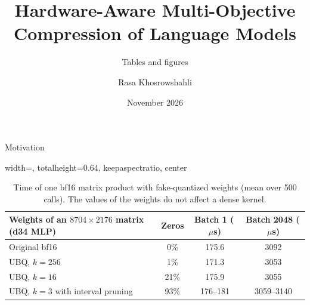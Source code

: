 \documentclass[aspectratio=169,10pt]{beamer}
\title{Hardware-Aware Multi-Objective Compression of Language Models}
\subtitle{Tables and figures}
\author{Rasa Khosrowshahli}
\date{November 2026}
\newcommand{\us}{\,$\mu$s}
\begin{document}
\begin{frame}
\titlepage
\end{frame}

\begin{frame}{Motivation}{}
\begin{table}
\centering
\begin{adjustbox}{width=\linewidth, totalheight=0.64\textheight, keepaspectratio, center}
\centering
\small
\begin{tabular}{lccc}
\toprule
Weights of an $8704\times2176$ matrix (d34 MLP) & Zeros & Batch 1 (\us) & Batch 2048 (\us) \\
\midrule
Original bf16                              & 0\%  & 175.6   & 3092 \\
UBQ, $k=256$                               & 1\%  & 171.3   & 3053 \\
UBQ, $k=16$                                & 21\% & 175.9   & 3055 \\
UBQ, $k=3$ with interval pruning           & 93\% & 176--181 & 3059--3140 \\
\bottomrule
\end{tabular}
\end{adjustbox}
\caption{Time of one bf16 matrix product with fake-quantized weights (mean over 500 calls). The values
of the weights do not affect a dense kernel.}\label{tab:fakequant}
\end{table}
\end{frame}
\end{document}
